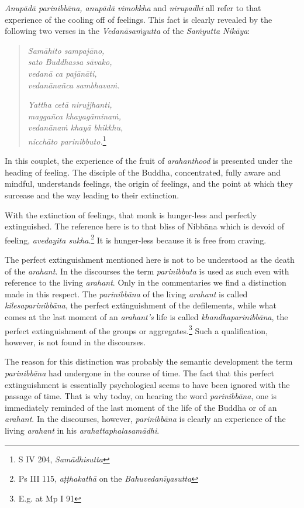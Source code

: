 \emph{Anupādā parinibbāna, anupādā vimokkha} and \emph{nirupadhi} all refer to that experience of the cooling off of feelings. This fact is clearly revealed by the following two verses in the \emph{Vedanāsaṁyutta} of the \emph{Saṁyutta Nikāya}:

\begin{quote}
\emph{Samāhito sampajāno,}\\
\emph{sato Buddhassa sāvako,}\\
\emph{vedanā ca pajānāti,}\\
\emph{vedanānañca sambhavaṁ.}

\emph{Yattha cetā nirujjhanti,}\\
\emph{maggañca khayagāminaṁ,}\\
\emph{vedanānaṁ khayā bhikkhu,}\\
\emph{nicchāto parinibbuto.}\footnote{S IV 204, \emph{Samādhisutta}}
\end{quote}

In this couplet, the experience of the fruit of \emph{arahanthood} is presented under the heading of feeling. The disciple of the Buddha, concentrated, fully aware and mindful, understands feelings, the origin of feelings, and the point at which they surcease and the way leading to their extinction.

With the extinction of feelings, that monk is hunger-less and perfectly extinguished. The reference here is to that bliss of Nibbāna which is devoid of feeling, \emph{avedayita sukha}.\footnote{Ps III 115, \emph{aṭṭhakathā} on the \emph{Bahuvedanīyasutta}} It is hunger-less because it is free from craving.

The perfect extinguishment mentioned here is not to be understood as the death of the \emph{arahant}. In the discourses the term \emph{parinibbuta} is used as such even with reference to the living \emph{arahant}. Only in the commentaries we find a distinction made in this respect. The \emph{parinibbāna} of the living \emph{arahant} is called \emph{kilesaparinibbāna}, the perfect extinguishment of the defilements, while what comes at the last moment of an \emph{arahant's} life is called \emph{khandhaparinibbāna}, the perfect extinguishment of the groups or aggregates.\footnote{E.g. at Mp I 91} Such a qualification, however, is not found in the discourses.

The reason for this distinction was probably the semantic development the term \emph{parinibbāna} had undergone in the course of time. The fact that this perfect extinguishment is essentially psychological seems to have been ignored with the passage of time. That is why today, on hearing the word \emph{parinibbāna}, one is immediately reminded of the last moment of the life of the Buddha or of an \emph{arahant}. In the discourses, however, \emph{parinibbāna} is clearly an experience of the living \emph{arahant} in his \emph{arahattaphalasamādhi}.

